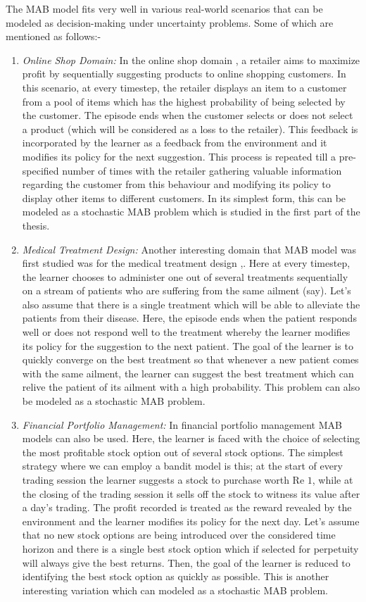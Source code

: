 
The MAB model fits very well in various real-world scenarios that can be modeled as decision-making under uncertainty  problems. Some of which are mentioned as follows:-
\begin{enumerate}
\item \emph{Online Shop Domain:} In the online shop domain \citep{ghavamzadeh2015bayesian}, a retailer aims to maximize profit by sequentially suggesting products to online shopping customers. In this scenario, at every timestep, the retailer displays an item to a customer from a pool of items which has the highest probability of being selected by the customer. The episode ends when the customer selects or does not select a product (which will be considered as a loss to the retailer). This feedback is incorporated by the learner as a feedback from the environment and it modifies its policy for the next suggestion. This process is repeated till a pre-specified number of times with the retailer gathering valuable information regarding the customer from this behaviour and modifying its policy to display other items to different customers. In its simplest form,  this can be modeled as a stochastic MAB problem which is studied in the first part of the thesis.
\item \emph{Medical Treatment Design:} Another interesting domain that MAB model was first studied was for the medical treatment design \citep{thompson1933likelihood},\citep{thompson1935theory}. Here at every timestep, the learner chooses to administer one out of several treatments sequentially on a stream of patients who are suffering from the same ailment (say). Let's also assume that there is a single treatment which will be able to alleviate the patients from their disease. Here, the episode ends when the patient responds well or does not respond well to the treatment whereby the learner modifies its policy for the suggestion to the next patient. The goal of the learner is to quickly converge on the best treatment so that whenever a new patient comes with the same ailment, the learner can suggest the best treatment which can relive the patient of its ailment with a high probability. This problem can also be modeled as a stochastic MAB problem.
\item \emph{Financial Portfolio Management:} In financial portfolio management MAB models can also be used. Here, the learner is faced with the choice of selecting the most profitable stock option out of several stock options. The simplest strategy where we can employ a bandit model is this; at the start of every trading session the learner suggests a stock to purchase worth Re $1$, while at the closing of the trading session it sells off the stock to witness its value after a day's trading. The  profit recorded is treated as the reward revealed by the environment and the learner modifies its policy for the next day. Let's assume that no new stock options are being introduced over the considered time horizon and there is a single best stock option which if selected for perpetuity will always give the best returns. Then, the goal of the learner is reduced to identifying the best stock option as quickly as possible. This is another interesting variation which can modeled as a stochastic MAB problem.

\end{enumerate}
